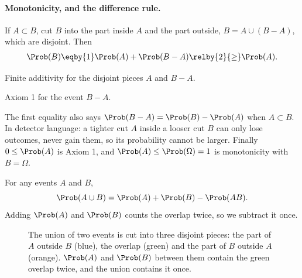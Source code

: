 \paragraph{Monotonicity, and the difference rule.} If $A\subset B$, cut $B$
into the part inside $A$ and the part outside, $B=A\cup(B-A)$, which are
disjoint. Then
\begin{align}
\Prob(B)\eqby{1}\Prob(A)+\Prob(B-A)\relby{2}{\ge}\Prob(A).
\label{1a:eq:monotone}
\end{align}
\begin{explain}
  \item Finite additivity for the disjoint pieces $A$ and $B-A$.
  \item Axiom 1 for the event $B-A$.
\end{explain}
The first equality also says $\Prob(B-A)=\Prob(B)-\Prob(A)$ when $A\subset B$.
In detector language: a tighter cut $A$ inside a looser cut $B$ can only lose
outcomes, never gain them, so its probability cannot be larger. Finally
$0\le\Prob(A)$ is Axiom 1, and $\Prob(A)\le\Prob(\Omega)=1$ is monotonicity with
$B=\Omega$.

\begin{keyidea}
For any events $A$ and $B$,
\begin{equation}
\Prob(A\cup B)=\Prob(A)+\Prob(B)-\Prob(AB).
\label{1a:eq:incl-excl}
\end{equation}
Adding $\Prob(A)$ and $\Prob(B)$ counts the overlap twice, so we subtract it once.
\end{keyidea}

\begin{figure}[htbp]
\centering
{}
\caption{The union of two events is cut into three disjoint pieces: the part
of $A$ outside $B$ (blue), the overlap (green) and the part of $B$ outside $A$
(orange). $\Prob(A)$ and $\Prob(B)$ between them contain the green overlap
twice, and the union contains it once.}
\label{1a:fig:incl-excl}
\end{figure}

